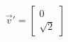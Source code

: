 \documentclass[preview]{standalone}
\begin{document}
\begin{align*}
\vec{v}'=\begin{bmatrix}0\\\sqrt{2}\end{bmatrix}
\end{align*}
\end{document}
